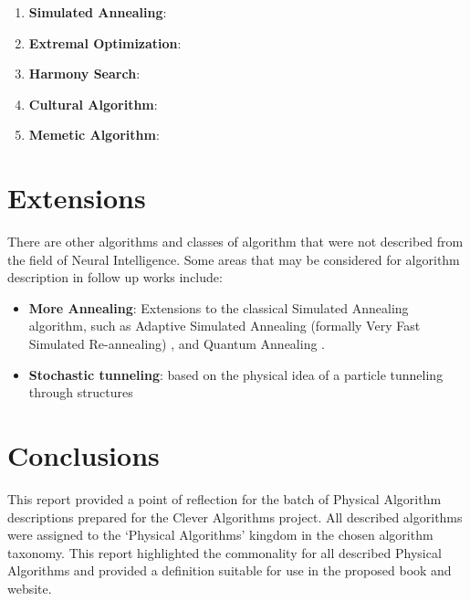 \documentclass[a4paper, 11pt]{article}
\begin{document}
\begin{enumerate}
	\item \textbf{Simulated Annealing}: \cite{Brownlee2010ak}
	\item \textbf{Extremal Optimization}: \cite{Brownlee2010al}
	\item \textbf{Harmony Search}: \cite{Brownlee2010am}
	\item \textbf{Cultural Algorithm}: \cite{Brownlee2010an}
	\item \textbf{Memetic Algorithm}: \cite{Brownlee2010ao}
\end{enumerate}

% 
% 
\section{Extensions}
\label{sec:extensions}
There are other algorithms and classes of algorithm that were not described from the field of Neural Intelligence. Some areas that may be considered for algorithm description in follow up works include:

\begin{itemize}
	\item \textbf{More Annealing}: Extensions to the classical Simulated Annealing algorithm, such as Adaptive Simulated Annealing (formally Very Fast Simulated Re-annealing) \cite{Ingber1989, Ingber1996}, and Quantum Annealing \cite{Apolloni1989, Das2005}.
	\item \textbf{Stochastic tunneling}: based on the physical idea of a particle tunneling through structures \cite{Wenzel1999}
\end{itemize}

% 
% 
\section{Conclusions}
\label{sec:conclusions}
This report provided a point of reflection for the batch of Physical Algorithm descriptions prepared for the Clever Algorithms project. All described algorithms were assigned to the `Physical Algorithms' kingdom in the chosen algorithm taxonomy. This report highlighted the commonality for all described Physical Algorithms and provided a definition suitable for use in the proposed book and website.



\end{document}
